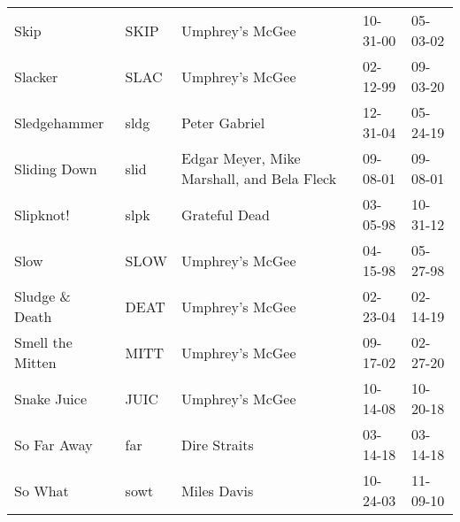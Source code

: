 \begin{longtable}{p{}p{}p{}p{}p{}}
                                                                    Skip &          SKIP &                                          Umphrey's McGee &              10-31-00 &             05-03-02 \\
                                                                 Slacker &          SLAC &                                          Umphrey's McGee &              02-12-99 &             09-03-20 \\
                                                            Sledgehammer &          sldg &                                            Peter Gabriel &              12-31-04 &             05-24-19 \\
                                                            Sliding Down &          slid &               Edgar Meyer, Mike Marshall, and Bela Fleck &              09-08-01 &             09-08-01 \\
                                                               Slipknot! &          slpk &                                            Grateful Dead &              03-05-98 &             10-31-12 \\
                                                                    Slow &          SLOW &                                          Umphrey's McGee &              04-15-98 &             05-27-98 \\
                                                         Sludge \& Death &          DEAT &                                          Umphrey's McGee &              02-23-04 &             02-14-19 \\
                                                        Smell the Mitten &          MITT &                                          Umphrey's McGee &              09-17-02 &             02-27-20 \\
                                                             Snake Juice &          JUIC &                                          Umphrey's McGee &              10-14-08 &             10-20-18 \\
                                                             So Far Away &           far &                                             Dire Straits &              03-14-18 &             03-14-18 \\
                                                                 So What &          sowt &                                              Miles Davis &              10-24-03 &             11-09-10 \\

\end{longtable}
